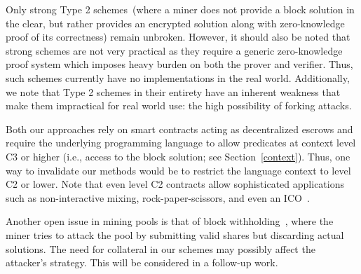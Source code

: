 \documentclass[runningheads]{llncs}
\begin{document}
Only strong Type 2 schemes~(where a miner does not provide a block solution in the clear, but rather provides an encrypted solution
along with zero-knowledge proof of its correctness) remain unbroken. However, it should also be noted that strong schemes are not very practical as they require a generic zero-knowledge proof system which imposes heavy burden on both the  prover and verifier. Thus, such schemes currently have no implementations in the real world. Additionally, we note that Type 2 schemes in their entirety have an inherent weakness that make them impractical for real world use: the high possibility of forking attacks. 


Both our approaches rely on smart contracts acting as decentralized escrows and require the underlying programming language to allow predicates at context level C3 or higher (i.e., access to the block solution; see Section~\ref{context}). Thus, one way to invalidate our methods would be to restrict the language context to level C2 or lower. Note that even level C2 contracts allow sophisticated applications such as non-interactive mixing, rock-paper-scissors, and even an ICO~\cite{advtutorial}.

Another open issue in mining pools is that of block withholding~\cite{courtois2014subversive}, where the miner tries to attack the pool by submitting valid shares but discarding actual solutions. The need for collateral in our schemes may possibly affect the attacker's strategy. This will be considered in a follow-up work.



\appendix
\end{document}
